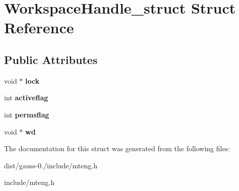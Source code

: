 \hypertarget{struct_workspace_handle__struct}{\section{Workspace\-Handle\-\_\-struct Struct Reference}
\label{struct_workspace_handle__struct}
}
\subsection*{Public Attributes}
\begin{DoxyCompactItemize}
\item 
\hypertarget{struct_workspace_handle__struct_affadc4f38f78fef9e476955883923a32}{void $\ast$ {\bfseries lock}}\label{struct_workspace_handle__struct_affadc4f38f78fef9e476955883923a32}

\item 
\hypertarget{struct_workspace_handle__struct_ac57f2dbfa658b218482ac4f957573158}{int {\bfseries activeflag}}\label{struct_workspace_handle__struct_ac57f2dbfa658b218482ac4f957573158}

\item 
\hypertarget{struct_workspace_handle__struct_a4bb5f73b4434886cfa22e236d26d647c}{int {\bfseries permsflag}}\label{struct_workspace_handle__struct_a4bb5f73b4434886cfa22e236d26d647c}

\item 
\hypertarget{struct_workspace_handle__struct_acc57d149081f1ece610235a5992846b4}{void $\ast$ {\bfseries wd}}\label{struct_workspace_handle__struct_acc57d149081f1ece610235a5992846b4}

\end{DoxyCompactItemize}


The documentation for this struct was generated from the following files\-:\begin{DoxyCompactItemize}
\item 
dist/gauss-\/0./include/mteng.\-h\item 
include/mteng.\-h\end{DoxyCompactItemize}
